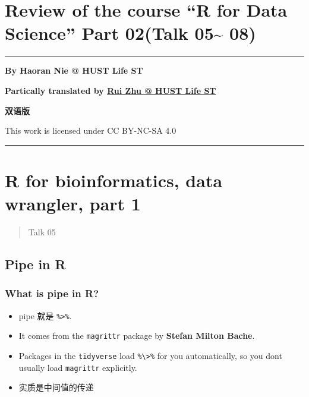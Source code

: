 \documentclass[
]{article}
\author{}
\date{}
\begin{document}
\hypertarget{review-of-the-course-r-for-data-science-part-02talk-05-08}{%
\section{Review of the course ``R for Data Science'' Part 02(Talk
05\textasciitilde{}
08)}\label{review-of-the-course-r-for-data-science-part-02talk-05-08}}

\begin{center}\rule{0.5\linewidth}{0.5pt}\end{center}

\textbf{By Haoran Nie @ HUST Life ST}

\textbf{Partically translated by
\href{https://github.com/1508324011}{Rui Zhu @ HUST Life ST}}

\textbf{双语版}

This work is licensed under CC BY-NC-SA 4.0

\begin{center}\rule{0.5\linewidth}{0.5pt}\end{center}

\hypertarget{r-for-bioinformatics-data-wrangler-part-1}{%
\section{R for bioinformatics, data wrangler, part
1}\label{r-for-bioinformatics-data-wrangler-part-1}}

\begin{quote}
Talk 05
\end{quote}

\hypertarget{pipe-in-r}{%
\subsection{Pipe in R}\label{pipe-in-r}}

\hypertarget{what-is-pipe-in-r}{%
\subsubsection{What is pipe in R?}\label{what-is-pipe-in-r}}

\begin{itemize}
\item
  pipe 就是 \texttt{\%\textgreater{}\%}.
\item
  It comes from the \texttt{magrittr} package by \textbf{Stefan Milton
  Bache}.
\item
  Packages in the \texttt{tidyverse} load
  \texttt{\%\textbackslash{}\textgreater{}\%} for you automatically, so
  you don\textquotesingle t usually load \texttt{magrittr} explicitly.
\item
  实质是中间值的传递
\end{itemize}
\end{document}
